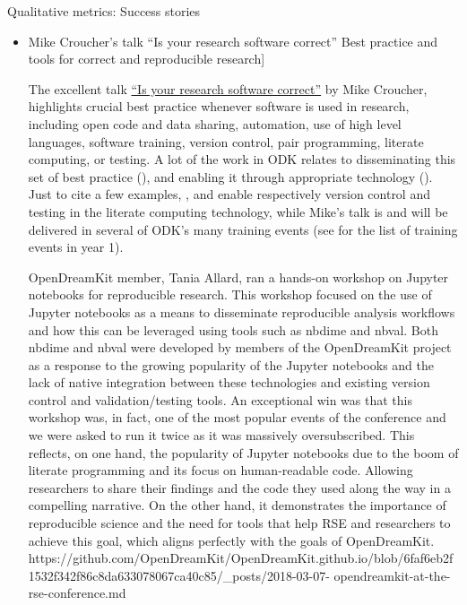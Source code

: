 \begin{Aim 1}
\begin{Aim 2}
Qualitative metrics: Success stories
\begin{itemize}
\item Mike Croucher's talk ``Is your research software correct''
Best practice and tools for correct and reproducible research]
        
        The excellent talk \href{https://mikecroucher.github.io/MLPM_talk/}{``Is your research software correct''} by Mike 
         Croucher, highlights crucial best practice whenever software is used in research, including open code and data sharing, 
         automation, use of high level languages, software training, version control, pair programming, literate computing, or testing. A 
         lot of the work in ODK relates to disseminating this set of best practice (), and enabling it through appropriate 
         technology ().  Just to cite a few examples, , and  
         enable respectively version control and testing in the \Jupyter literate computing technology, while Mike's talk is and will be 
         delivered in several of ODK's many training events (see  for the list of training events in year 
         1).
         
         OpenDreamKit member, Tania Allard, ran a hands-on workshop on Jupyter notebooks for reproducible research. This workshop focused on 
         the use of Jupyter notebooks as a means to disseminate reproducible analysis workflows and how this can be leveraged using tools 
         such as nbdime and nbval. Both nbdime and nbval were developed by members of the OpenDreamKit project as a response to the growing 
         popularity of the Jupyter notebooks and the lack of native integration between these technologies and existing version control and 
         validation/testing tools.
         An exceptional win was that this workshop was, in fact, one of the most popular events of the conference and we were asked to run 
         it twice as it was massively oversubscribed. This reflects, on one hand, the popularity of Jupyter notebooks due to the boom of 
         literate programming and its focus on human-readable code. Allowing researchers to share their findings and the code they used 
         along the way in a compelling narrative. On the other hand, it demonstrates the importance of reproducible science and the need for 
         tools that help RSE and researchers to achieve this goal, which aligns perfectly with the goals of OpenDreamKit.
         https://github.com/OpenDreamKit/OpenDreamKit.github.io/blob/6faf6eb2f1532f342f86c8da633078067ca40c85/_posts/2018-03-07-
         opendreamkit-at-the-rse-conference.md


\end{itemize}
\end{Aim 2}
\end{Aim 1}
